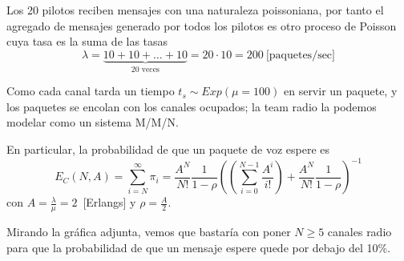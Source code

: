 \documentclass{upmassignment}
\begin{document}
\begin{problemlist}
    \begin{minipage}{\textwidth}
        \centering
        \resizebox{!}{.27\textwidth}{%
            
        }
    \end{minipage}

    \begin{solucion}
        Los 20 pilotos reciben mensajes con una
naturaleza poissoniana, por tanto el agregado
de mensajes generado por todos los pilotos
es otro proceso de Poisson cuya tasa
es la suma de las tasas
\begin{equation*}
    \lambda=\underbrace{10+10+\ldots+10}_{\text{20 veces}}=20\cdot10=200~\text{[paquetes/sec]}
\end{equation*}

Como cada canal tarda un tiempo
$t_s\sim Exp(\mu=100)$ en servir un paquete,
y los paquetes se encolan con los canales
ocupados; la team radio la podemos modelar
como un sistema M/M/N.

En particular, la probabilidad de que un paquete
de voz espere es
\begin{equation*}
    E_C(N,A)=\sum_{i=N}^\infty \pi_i
    = \frac{A^N}{N!}\frac{1}{1-\rho}
    \left(
        \left(\sum_{i=0}^{N-1}
        \frac{A^i}{i!}
        \right)
        + \frac{A^N}{N!}\frac{1}{1-\rho}
    \right)^{-1}
\end{equation*}
con $A=\tfrac{\lambda}{\mu}=2$~[Erlangs]
y $\rho=\tfrac{A}{2}$.

Mirando la gráfica adjunta, vemos que bastaría
con poner $N\geq5$ canales radio para que
la probabilidad de que un mensaje espere quede
por debajo del 10\%.


    \end{solucion}
\end{problemlist}
\end{document}
